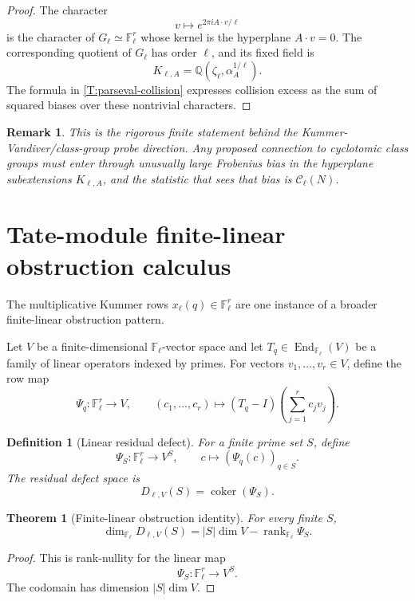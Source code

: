 \documentclass[11pt]{article}
\newtheorem{theorem}{Theorem}
\newtheorem{definition}{Definition}
\newtheorem{remark}{Remark}
\newcommand{\Q}{\mathbb Q}
\newcommand{\F}{\mathbb F}
\newcommand{\rank}{\operatorname{rank}}
\newcommand{\coker}{\operatorname{coker}}
\begin{document}
\begin{proof}
The character
\[
v\mapsto e^{2\pi i A\cdot v/\ell}
\]
is the character of \(G_\ell\simeq\F_\ell^r\) whose kernel is the hyperplane \(A\cdot v=0\).  The corresponding quotient of \(G_\ell\) has order \(\ell\), and its fixed field is
\[
K_{\ell,A}=\Q(\zeta_\ell,\alpha_A^{1/\ell}).
\]
The formula in \cref{T:parseval-collision} expresses collision excess as the sum of squared biases over these nontrivial characters.
\end{proof}

\begin{remark}
This is the rigorous finite statement behind the Kummer-Vandiver/class-group probe direction.  Any proposed connection to cyclotomic class groups must enter through unusually large Frobenius bias in the hyperplane subextensions \(K_{\ell,A}\), and the statistic that sees that bias is \(\mathcal C_\ell(N)\).
\end{remark}

\section{Tate-module finite-linear obstruction calculus}

The multiplicative Kummer rows \(x_\ell(q)\in\F_\ell^r\) are one instance of a broader finite-linear obstruction pattern.

Let \(V\) be a finite-dimensional \(\F_\ell\)-vector space and let \(T_q\in\operatorname{End}_{\F_\ell}(V)\) be a family of linear operators indexed by primes.  For vectors \(v_1,\ldots,v_r\in V\), define the row map
\[
\Psi_q:\F_\ell^r\to V,
\qquad
(c_1,\ldots,c_r)\mapsto (T_q-I)\left(\sum_{j=1}^r c_jv_j\right).
\]

\begin{definition}[Linear residual defect]\label{D:linear-residual}
For a finite prime set \(S\), define
\[
\Psi_S:\F_\ell^r\to V^S,
\qquad
c\mapsto(\Psi_q(c))_{q\in S}.
\]
The residual defect space is
\[
D_{\ell,V}(S)=\coker(\Psi_S).
\]
\end{definition}

\begin{theorem}[Finite-linear obstruction identity]\label{T:finite-linear}
For every finite \(S\),
\[
\dim_{\F_\ell}D_{\ell,V}(S)
=
|S|\dim V-\rank_{\F_\ell}\Psi_S.
\]
\end{theorem}

\begin{proof}
This is rank-nullity for the linear map
\[
\Psi_S:\F_\ell^r\to V^S.
\]
The codomain has dimension \(|S|\dim V\).
\end{proof}
\end{document}
